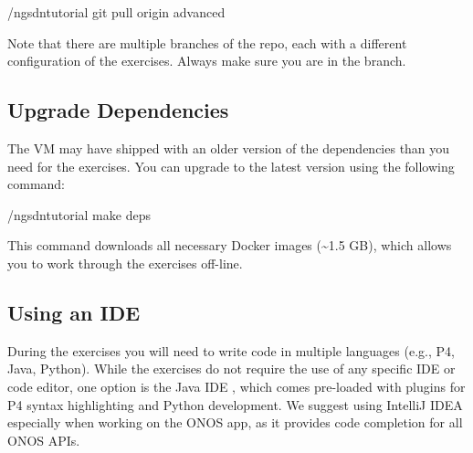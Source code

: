 \documentclass[letterpaper,11pt,english]{sphinxmanual}
\begin{document}
\begin{sphinxVerbatim}[commandchars=\\\{\}]
\PYGZdl{}  \PYGZti{}/ngsdn\PYGZhy{}tutorial
\PYGZdl{} git pull origin advanced
\end{sphinxVerbatim}

Note that there are multiple branches of the repo, each with a
different configuration of the exercises. Always make sure you are in
the  branch.


\subsection{Upgrade Dependencies}
\label{\detokenize{exercises:upgrade-dependencies}}
The VM may have shipped with an older version of the dependencies than
you need for the exercises. You can upgrade to the latest version
using the following command:

\begin{sphinxVerbatim}[commandchars=\\\{\}]
\PYGZdl{}  \PYGZti{}/ngsdn\PYGZhy{}tutorial
\PYGZdl{} make deps
\end{sphinxVerbatim}

This command downloads all necessary Docker images (\textasciitilde{}1.5 GB), which
allows you to work through the exercises off-line.


\subsection{Using an IDE}
\label{\detokenize{exercises:using-an-ide}}
During the exercises you will need to write code in multiple languages
(e.g., P4, Java, Python). While the exercises do not require the use
of any specific IDE or code editor, one option is the Java IDE
,
which comes pre-loaded with plugins for P4 syntax highlighting and
Python development. We suggest using IntelliJ IDEA especially when
working on the ONOS app, as it provides code completion for all ONOS
APIs.
\end{document}
